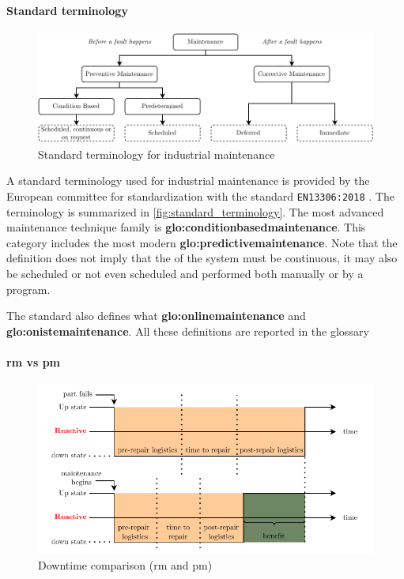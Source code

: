 \paragraph{Standard terminology}
\begin{figure}
    \centering
    \includegraphics[width=\textwidth]{images/StateArt/EN_classification.drawio.pdf}
    \caption{Standard terminology for industrial maintenance \cite{rastegari2017condition}}
    \label{fig:standard_terminology}
\end{figure}

A standard terminology used for industrial maintenance is provided by the European committee for standardization with the standard \texttt{EN13306:2018} \cite{EN13306:2018}. The terminology is summarized in \autoref{fig:standard_terminology}. The most advanced maintenance technique family is \textbf{\gls{glo:conditionbasedmaintenance}}. This category includes the most modern \textbf{\gls{glo:predictivemaintenance}}. Note that the definition does not imply that the  of the system must be continuous, it may also be scheduled or not even scheduled and performed both manually or by a program.

The standard also defines what \textbf{\gls{glo:onlinemaintenance}} and \textbf{\gls{glo:onistemaintenance}}. All these definitions are reported in the {glossary}


\paragraph{\gls{rm} vs \gls{pm}}
\begin{figure}
    \centering
    \includegraphics[width=\textwidth]{images/StateArt/lost_opportunities.pdf}
    \caption{Downtime comparison (\gls{rm} and \gls{pm})}
    \label{fig:lost_opportunities}
\end{figure}

